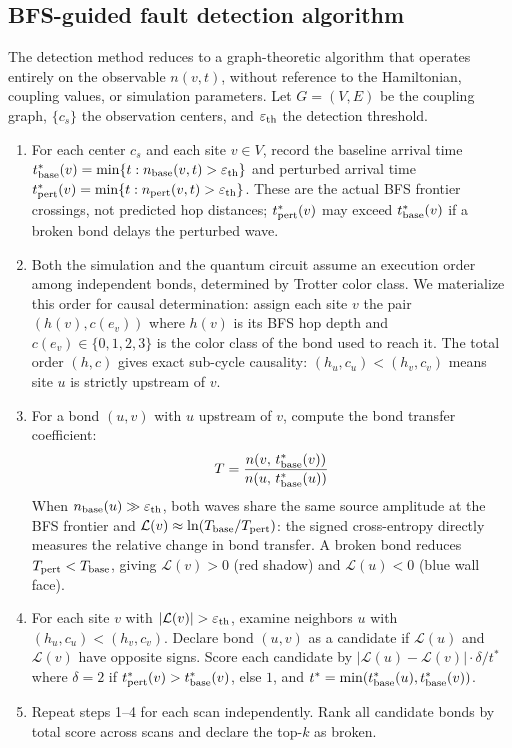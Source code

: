 \documentclass[11pt]{article}
\begin{document}
\subsection*{BFS-guided fault detection algorithm}

The detection method reduces to a graph-theoretic algorithm that operates
entirely on the observable $n(v,t)$, without reference to the Hamiltonian,
coupling values, or simulation parameters.
Let $G = (V, E)$ be the coupling graph, $\{c_s\}$ the observation centers,
and $\varepsilon_{\rm th}$ the detection threshold.

\begin{enumerate}
    \item For each center $c_s$ and each site $v \in V$, record the
    baseline arrival time $t^*_{\rm base}(v) = \min\{t : n_{\rm base}(v,t) > \varepsilon_{\rm th}\}$
    and perturbed arrival time $t^*_{\rm pert}(v) = \min\{t : n_{\rm pert}(v,t) > \varepsilon_{\rm th}\}$.
    These are the actual BFS frontier crossings, not predicted hop distances;
    $t^*_{\rm pert}(v)$ may exceed $t^*_{\rm base}(v)$ if a broken bond delays the perturbed wave.

    \item Both the simulation and the quantum circuit assume an execution order
    among independent bonds, determined by Trotter color class. We materialize
    this order for causal determination: assign each site $v$ the pair $(h(v), c(e_v))$
    where $h(v)$ is its BFS hop depth and $c(e_v) \in \{0,1,2,3\}$ is the color
    class of the bond used to reach it. The total order $(h, c)$ gives exact
    sub-cycle causality: $(h_u, c_u) < (h_v, c_v)$ means site $u$ is strictly
    upstream of $v$.

    \item For a bond $(u, v)$ with $u$ upstream of $v$, compute the bond
    transfer coefficient:
    \begin{equation}
        T = \frac{n(v,\, t^*_{\rm base}(v))}{n(u,\, t^*_{\rm base}(u))}
    \end{equation}
    When $n_{\rm base}(u) \gg \varepsilon_{\rm th}$, both waves share the same
    source amplitude at the BFS frontier and
    $\mathcal{L}(v) \approx \ln(T_{\rm base}/T_{\rm pert})$:
    the signed cross-entropy directly measures the relative change in bond transfer.
    A broken bond reduces $T_{\rm pert} < T_{\rm base}$, giving $\mathcal{L}(v) > 0$
    (red shadow) and $\mathcal{L}(u) < 0$ (blue wall face).

    \item For each site $v$ with $|\mathcal{L}(v)| > \varepsilon_{\rm th}$, examine
    neighbors $u$ with $(h_u, c_u) < (h_v, c_v)$. Declare bond $(u,v)$ as a candidate
    if $\mathcal{L}(u)$ and $\mathcal{L}(v)$ have opposite signs. Score each candidate
    by $|\mathcal{L}(u) - \mathcal{L}(v)| \cdot \delta / t^*$ where $\delta = 2$ if
    $t^*_{\rm pert}(v) > t^*_{\rm base}(v)$, else $1$, and
    $t^* = \min(t^*_{\rm base}(u), t^*_{\rm base}(v))$.

    \item Repeat steps 1--4 for each scan independently. Rank all candidate bonds
    by total score across scans and declare the top-$k$ as broken.
\end{enumerate}
\end{document}
